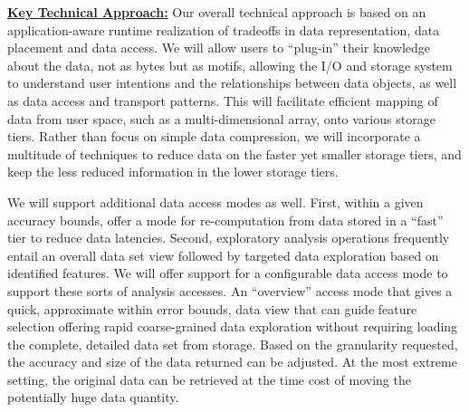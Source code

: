 \documentclass[11pt,letterpaper]{article}
\begin{document}
\underline{\textbf{Key Technical Approach:}}
Our overall technical approach is based on an application-aware runtime realization of tradeoffs in 
data representation, data placement and data access. We will allow users to ``plug-in'' 
their knowledge about the data, not as bytes but as motifs, allowing the I/O and storage system
to understand user intentions and the relationships between data objects, as well as data
access and transport patterns. This will facilitate
efficient mapping of data from user space, such as a multi-dimensional array, onto various storage tiers. 
Rather than focus on simple data
compression, we will incorporate a multitude of techniques to reduce data on the faster yet smaller
storage tiers, and keep the less
reduced information in the lower storage tiers.

We will support additional data access modes as well. First, within a given
accuracy bounds, offer a mode for re-computation from data stored in a ``fast''
tier to reduce data latencies. Second, exploratory analysis operations
frequently entail an overall data set view followed by targeted data
exploration based on identified features. We will offer support for a
configurable data access mode to support these sorts of analysis accesses. An
``overview'' access mode that gives a quick, approximate within error bounds,
data view that can guide feature selection offering rapid coarse-grained data
exploration without requiring loading the complete, detailed data set from
storage. Based on the granularity requested, the accuracy and size of the data
returned can be adjusted. At the most extreme setting, the original data can
be retrieved at the time cost of moving the potentially huge data quantity.
\end{document}
